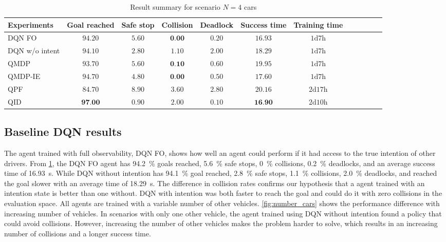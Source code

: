 \begin{table}
\caption{Result summary for scenario $N=4$ cars}
\label{tab:results_summary}
\begin{tabularx}{\columnwidth}{@{}l*{10}{c}c@{}}
\toprule
Experiments     & Goal reached & Safe stop & Collision & Deadlock & Success time & Training time\\ 
\midrule
DQN FO & $94.20$ & $5.60$ & $\textbf{0.00}$ & $0.20$ & $16.93$ & $1\si{\day}7\si{\hour}$ \\ 
DQN w/o intent & $94.10$ & $2.80$ & $1.10$ & $2.00$ & $18.29$ & $1\si{\day}7\si{\hour}$ \\ 
QMDP & $93.70$ & $5.60$ & $\textbf{0.10}$ & $0.60$ & $19.95$ & $1\si{\day}7\si{\hour}$ \\ 
QMDP-IE & $94.70$ & $4.80$ & $\textbf{0.00}$ & $0.50$ & $17.60$ & $1\si{\day}7\si{\hour}$ \\  
QPF & $84.70$ & $8.90$ & $3.60$ & $2.80$ & $20.16$ & $2\si{\day}17\si{\hour}$ \\ 
QID & $\textbf{97.00}$ & $0.90$ & $2.00$ & $0.10$ & $\textbf{16.90}$ & $2\si{\day}10\si{\hour}$ \\ 
\bottomrule
\end{tabularx}
\end{table}


\subsection{Baseline DQN results}
The agent trained with full observability, DQN FO, shows how well an agent could perform if it had access to the true intention of other drivers. From \ref{tab:results_summary}, the DQN FO agent has \SI{94.2}{\percent} goals reached, \SI{5.6}{\percent} safe stops, \SI{0}{\percent} collisions, \SI{.2}{\percent} deadlocks, and an average success time of \SI{16.93}{\second}. 
While DQN without intention has \SI{94.1}{\percent} goal reached, \SI{2.8}{\percent} safe stops, \SI{1.1}{\percent} collisions, \SI{2.0}{\percent} deadlocks, and reached the goal slower with an average time of \SI{18.29}{\second}.
The difference in collision rates confirms our hypothesis that a agent trained with an intention state is better than one without. DQN with intention was both faster to reach the goal and could do it with zero collisions in the evaluation space.
All agents are trained with a variable number of other vehicles. \ref{fig:number_cars} shows the performance difference with increasing number of vehicles. In scenarios with only one other vehicle, the agent trained using DQN without intention found a policy that could avoid collisions. However, increasing the number of other vehicles makes the problem harder to solve, which results in an increasing number of collisions and a longer success time. 


